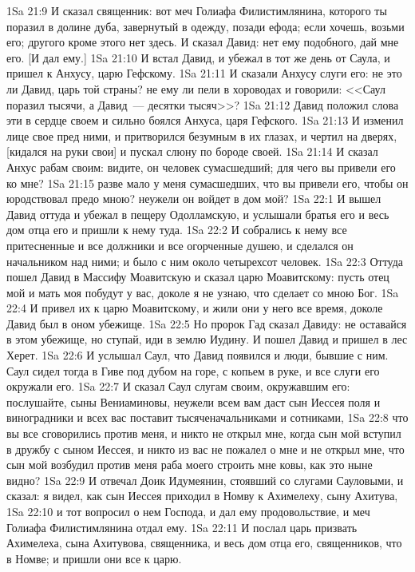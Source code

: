 \vs 1Sa 21:9 И сказал священник: вот меч Голиафа Филистимлянина, которого ты поразил в долине дуба, завернутый в одежду, позади ефода; если хочешь, возьми его; другого кроме этого нет здесь. И сказал Давид: нет ему подобного, дай мне его. [И дал ему.]
\vs 1Sa 21:10 И встал Давид, и убежал в тот же день от Саула, и пришел к Анхусу, царю Гефскому.
\vs 1Sa 21:11 И сказали Анхусу слуги его: не это ли Давид, царь той страны? не ему ли пели в хороводах и говорили: <<Саул поразил тысячи, а Давид~--- десятки тысяч>>?
\vs 1Sa 21:12 Давид положил слова эти в сердце своем и сильно боялся Анхуса, царя Гефского.
\vs 1Sa 21:13 И изменил лице свое пред ними, и притворился безумным в их глазах, и чертил на дверях, [кидался на руки свои] и пускал слюну по бороде своей.
\vs 1Sa 21:14 И сказал Анхус рабам своим: видите, он человек сумасшедший; для чего вы привели его ко мне?
\vs 1Sa 21:15 разве мало у меня сумасшедших, что вы привели его, чтобы он юродствовал предо мною? неужели он войдет в дом мой?
\vs 1Sa 22:1 И вышел Давид оттуда и убежал в пещеру Одолламскую, и услышали братья его и весь дом отца его и пришли к нему туда.
\vs 1Sa 22:2 И собрались к нему все притесненные и все должники и все огорченные душею, и сделался он начальником над ними; и было с ним около четырехсот человек.
\vs 1Sa 22:3 Оттуда пошел Давид в Массифу Моавитскую и сказал царю Моавитскому: пусть отец мой и мать моя побудут у вас, доколе я не узнаю, что сделает со мною Бог.
\vs 1Sa 22:4 И привел их к царю Моавитскому, и жили они у него все время, доколе Давид был в оном убежище.
\vs 1Sa 22:5 Но пророк Гад сказал Давиду: не оставайся в этом убежище, но ступай, иди в землю Иудину. И пошел Давид и пришел в лес Херет.
\vs 1Sa 22:6 И услышал Саул, что Давид появился и люди, бывшие с ним. Саул сидел тогда в Гиве под дубом на горе, с копьем в руке, и все слуги его окружали его.
\vs 1Sa 22:7 И сказал Саул слугам своим, окружавшим его: послушайте, сыны Вениаминовы, неужели всем вам даст сын Иессея поля и виноградники и всех вас поставит тысяченачальниками и сотниками,
\vs 1Sa 22:8 что вы все сговорились против меня, и никто не открыл мне, когда сын мой вступил в дружбу с сыном Иессея, и никто из вас не пожалел о мне и не открыл мне, что сын мой возбудил против меня раба моего строить мне ковы, как это ныне видно?
\vs 1Sa 22:9 И отвечал Доик Идумеянин, стоявший со слугами Сауловыми, и сказал: я видел, как сын Иессея приходил в Номву к Ахимелеху, сыну Ахитува,
\vs 1Sa 22:10 и тот вопросил о нем Господа, и дал ему продовольствие, и меч Голиафа Филистимлянина отдал ему.
\vs 1Sa 22:11 И послал царь призвать Ахимелеха, сына Ахитувова, священника, и весь дом отца его, священников, что в Номве; и пришли они все к царю.
